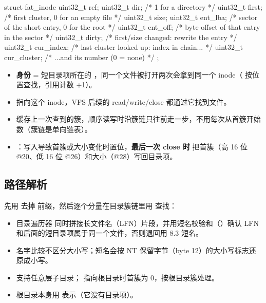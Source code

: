 \begin{ccode}
struct fat_inode {
    uint32_t ref;
    uint32_t dir;          /* 1 for a directory */
    uint32_t first;        /* first cluster, 0 for an empty file */
    uint32_t size;
    uint32_t ent_lba;      /* sector of the short entry, 0 for the root */
    uint32_t ent_off;      /* byte offset of that entry in the sector */
    uint32_t dirty;        /* first/size changed: rewrite the entry */
    uint32_t cur_index;    /* last cluster looked up: index in chain... */
    uint32_t cur_cluster;  /* ...and its number (0 = none) */
};
\end{ccode}

\begin{itemize}
  \item \textbf{身份} = 短目录项所在的 ，同一个文件被打开两次会拿到同一个 inode（ 按位置查找，引用计数 +1）。
  \item {} 指向这个 inode，VFS 后续的 read/write/close 都通过它找到文件。
  \item {} 缓存上一次查到的簇，顺序读写时沿簇链只往前走一步，不用每次从首簇开始数（簇链是单向链表）。
  \item {}：写入导致首簇或大小变化时置位，\textbf{最后一次 close 时}  把首簇（高 16 位 @20、低 16 位 @26）和大小（@28）写回目录项。
\end{itemize}

\subsection{路径解析}

 先用  去掉  前缀，然后逐个分量在目录簇链里用  查找：

\begin{itemize}
  \item 目录遍历器  同时拼接长文件名（LFN）片段，并用短名校验和（）确认 LFN 和后面的短目录项属于同一个文件，否则退回用 8.3 短名。
  \item 名字比较不区分大小写；短名会按 NT 保留字节（byte 12）的大小写标志还原成小写。
  \item 支持任意层子目录； 指向根目录时首簇为 0，按根目录簇处理。
  \item 根目录本身用  表示（它没有目录项）。
\end{itemize}

